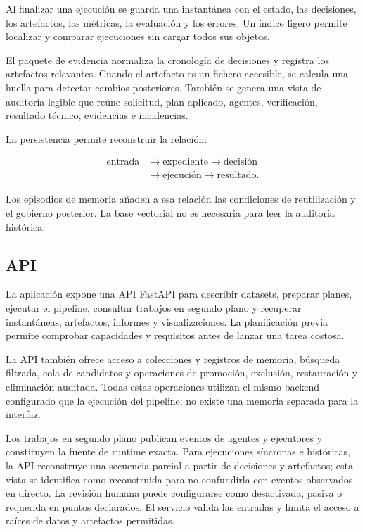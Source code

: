 Al finalizar una ejecución se guarda una instantánea con el estado, las
decisiones, los artefactos, las métricas, la evaluación y los errores. Un índice
ligero permite localizar y comparar ejecuciones sin cargar todos sus objetos.

El paquete de evidencia normaliza la cronología de decisiones y registra los
artefactos relevantes. Cuando el artefacto es un fichero accesible, se calcula
una huella para detectar cambios posteriores. También se genera una vista de
auditoría legible que reúne solicitud, plan aplicado, agentes, verificación,
resultado técnico, evidencias e incidencias.

La persistencia permite reconstruir la relación:

\[
\begin{aligned}
\text{entrada}
&\longrightarrow \text{expediente}
\longrightarrow \text{decisión} \\
&\longrightarrow \text{ejecución}
\longrightarrow \text{resultado}.
\end{aligned}
\]

Los episodios de memoria añaden a esa relación las condiciones de reutilización
y el gobierno posterior. La base vectorial no es necesaria para leer la
auditoría histórica.

\subsection{API}

La aplicación expone una API FastAPI para describir datasets, preparar planes,
ejecutar el pipeline, consultar trabajos en segundo plano y recuperar
instantáneas, artefactos, informes y visualizaciones. La planificación previa
permite comprobar capacidades y requisitos antes de lanzar una tarea costosa.

La API también ofrece acceso a colecciones y registros de memoria, búsqueda
filtrada, cola de candidatos y operaciones de promoción, exclusión,
restauración y eliminación auditada. Todas estas operaciones utilizan el mismo
backend configurado que la ejecución del pipeline; no existe una memoria
separada para la interfaz.

Los trabajos en segundo plano publican eventos de agentes y ejecutores y
constituyen la fuente de runtime exacta. Para ejecuciones síncronas e históricas,
la API reconstruye una secuencia parcial a partir de decisiones y artefactos;
esta vista se identifica como reconstruida para no confundirla con eventos
observados en directo. La revisión humana puede configurarse como desactivada,
pasiva o requerida en puntos declarados. El servicio valida las entradas y
limita el acceso a raíces de datos y artefactos permitidas.

